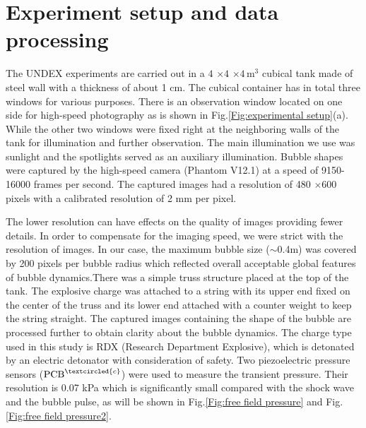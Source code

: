 \documentclass[%
 aip,
 amsmath,amssymb,
 reprint,%
]{revtex4-1}
\begin{document}
\section{Experiment setup and data processing}
\label{S:experiment setup}
The UNDEX experiments are carried out in a $4$ $\times 4$ $\times 4\,\text{m}^3$  cubical tank made of steel wall with a thickness of about 1 cm. The cubical container has in total three windows for various purposes. There is an observation window located on one side for high-speed photography as is shown in Fig.\ref{Fig:experimental setup}(a). While the other two windows were fixed right at the neighboring walls of the tank for illumination and further observation. The main illumination we use was sunlight and the spotlights served as an auxiliary illumination. Bubble shapes were captured by the high-speed camera (Phantom V12.1) at a speed of 9150-16000 frames per second. The captured images had a resolution of 480 $\times$600 pixels with a calibrated resolution of 2 mm per pixel.  {{The lower resolution can have effects on the quality of images providing fewer details.  In order to compensate for the imaging speed, we were strict with the resolution of images. In our case, the maximum bubble size ($\sim$0.4m) was covered by 200 pixels per bubble radius which reflected overall acceptable global features of bubble dynamics.}There was a simple truss structure placed at the top of the tank. The explosive charge was attached to a string with its upper end fixed on the center of the truss and its lower end attached with a counter weight to keep the string straight. The captured images containing the shape of the bubble are processed further to obtain clarity about the bubble dynamics. The charge type used in this study is RDX (Research Department Explosive), which is detonated by an electric detonator with consideration of safety. { Two piezoelectric pressure sensors ($\text{PCB}^{\textcircled{c}}$) were used to measure the transient pressure. Their resolution  is 0.07 kPa which is significantly small compared with the shock wave and the bubble pulse, as will be shown in Fig.\ref{Fig:free field pressure} and Fig.\ref{Fig:free field pressure2}.}

}
\end{document}
